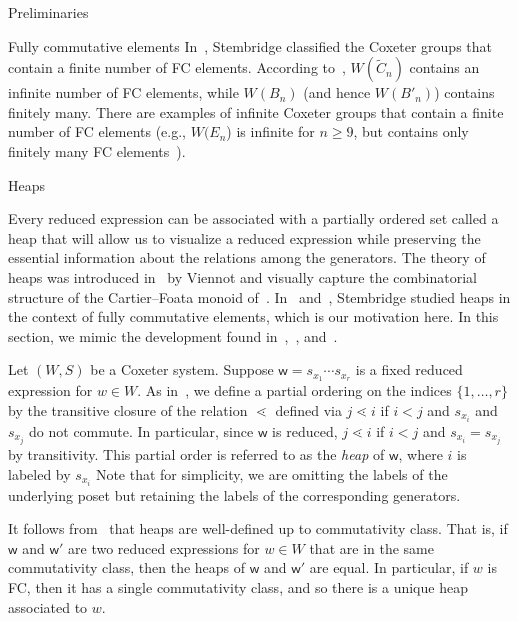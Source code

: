 \documentclass[11pt]{amsart}
\theoremstyle{definition}
\numberwithin{equation}{section}
\newcommand{\C}{\widetilde{C}}
\renewcommand{\(}{\left(}
\renewcommand{\)}{\right)}
\newcommand{\w}{\mathsf{w}}
\begin{document}
\begin{section}{Preliminaries}
\begin{subsection}{Fully commutative elements}
In~\cite{Stembridge1996}, Stembridge classified the Coxeter groups that contain a finite number of FC elements.  According to~\cite[Theorem 5.1]{Stembridge1996}, $W(\C_{n})$ contains an infinite number of FC elements, while $W(B_{n})$ (and hence $W(B'_n)$) contains finitely many.  There are examples of infinite Coxeter groups that contain a finite number of FC elements (e.g., $W(E_n$) is infinite for $n\geq 9$, but contains only finitely many FC elements~\cite[Theorem 5.1]{Stembridge1996}).

\end{subsection}


\begin{subsection}{Heaps}\label{subsec:heaps}

Every reduced expression can be associated with a partially ordered set called a heap that will allow us to visualize a reduced expression  while preserving the essential information about the relations among the generators.  The theory of heaps was introduced in~\cite{Viennot1986} by Viennot and visually capture the combinatorial structure of the Cartier--Foata monoid of~\cite{Cartier1969}.  
In~\cite{Stembridge1996} and~\cite{Stembridge1998}, Stembridge studied heaps in the context of fully commutative elements, which is our motivation here.  
In this section, we mimic the development found in~\cite{Billey2007},~\cite{Ernst2010}, and~\cite{Stembridge1996}.

Let $(W,S)$ be a Coxeter system.  Suppose $\w = s_{x_1} \cdots s_{x_r}$ is a fixed reduced expression for $w \in W$.  As in~\cite{Stembridge1996}, we define a partial ordering on the indices $\{1, \dots, r\}$ by the transitive closure of the relation $\lessdot$ defined via $j \lessdot i$ if $i < j$ and $s_{x_i}$ and $s_{x_j}$ do not commute.  In particular, since $\w$ is reduced, $j \lessdot i$ if $i < j$ and $s_{x_i} = s_{x_j}$ by transitivity.  This partial order is referred to as the \emph{heap} of $\w$, where $i$ is labeled by $s_{x_i}$  Note that for simplicity, we are omitting the labels of the underlying poset but retaining the labels of the corresponding generators.

It follows from~\cite[Proposition 2.2]{Stembridge1996} that heaps are well-defined up to commutativity class.  That is, if $\w$ and $\w'$ are two reduced expressions for $w \in W$ that are in the same commutativity class, then the heaps of $\w$ and $\w'$ are equal.  
In particular, if $w$ is FC, then it has a single commutativity class, and so there is a unique heap associated to $w$.



\end{subsection}
\end{section}
\end{document}
